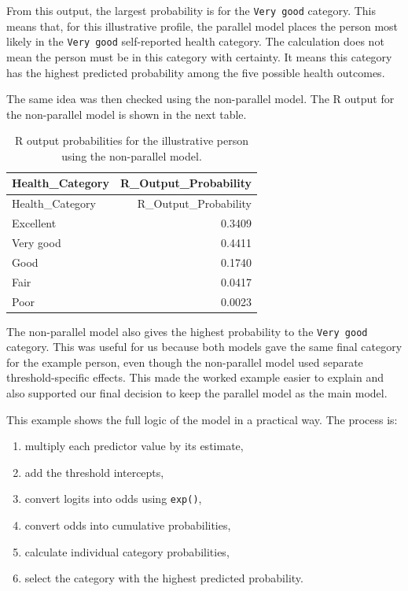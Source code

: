 \documentclass{article}
\providecommand{\tightlist}{%
  \setlength{\itemsep}{0pt}\setlength{\parskip}{0pt}}
\begin{document}
From this output, the largest probability is for the \texttt{Very\ good}
category. This means that, for this illustrative profile, the parallel
model places the person most likely in the \texttt{Very\ good}
self-reported health category. The calculation does not mean the person
must be in this category with certainty. It means this category has the
highest predicted probability among the five possible health outcomes.

The same idea was then checked using the non-parallel model. The R
output for the non-parallel model is shown in the next table.

\begin{longtable}[]{@{}lr@{}}
\caption{R output probabilities for the illustrative person using the
non-parallel model.}\tabularnewline
\toprule\noalign{}
Health\_Category & R\_Output\_Probability \\
\midrule\noalign{}
\endfirsthead
\toprule\noalign{}
Health\_Category & R\_Output\_Probability \\
\midrule\noalign{}
\endhead
\bottomrule\noalign{}
\endlastfoot
Excellent & 0.3409 \\
Very good & 0.4411 \\
Good & 0.1740 \\
Fair & 0.0417 \\
Poor & 0.0023 \\
\end{longtable}

The non-parallel model also gives the highest probability to the
\texttt{Very\ good} category. This was useful for us because both models
gave the same final category for the example person, even though the
non-parallel model used separate threshold-specific effects. This made
the worked example easier to explain and also supported our final
decision to keep the parallel model as the main model.

This example shows the full logic of the model in a practical way. The
process is:

\begin{enumerate}
\def\labelenumi{\arabic{enumi}.}
\tightlist
\item
  multiply each predictor value by its estimate,
\item
  add the threshold intercepts,
\item
  convert logits into odds using \texttt{exp()},
\item
  convert odds into cumulative probabilities,
\item
  calculate individual category probabilities,
\item
  select the category with the highest predicted probability.
\end{enumerate}
\end{document}
